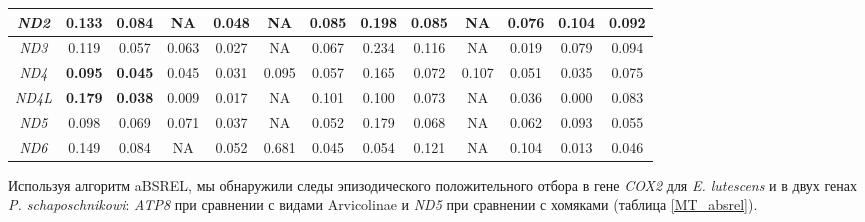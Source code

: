 \begin{landscape}
\begin{table}[]
\begin{tabular}{|c|c|c|c|c|c|c|c|c|c|c|c|c|}
			{\textit{ND2}} & 0.133 & 0.084 & NA & 0.048 & NA & 0.085 & 0.198 & 0.085 & NA & 0.076 & 0.104& 0.092 \\ \hline
			\textit{ND3} & 0.119 & 0.057 & 0.063 & 0.027 & NA & 0.067 & 0.234 & 0.116 & NA & 0.019 & 0.079& 0.094 \\ \hline
			\textit{ND4} & \textbf{0.095} & \textbf{0.045} & 0.045 & 0.031 & 0.095 & 0.057 & 0.165 & 0.072 & 0.107 & 0.051 & 0.035& 0.075 \\ \hline
			\textit{ND4L} & \textbf{0.179} & \textbf{0.038} & 0.009 & 0.017 & NA & 0.101 & 0.100 & 0.073 & NA & 0.036 & 0.000& 0.083 \\ \hline
			{\textit{ND5}} & 0.098 & 0.069 & 0.071 & 0.037 & NA & 0.052 & 0.179 & 0.068 & NA & 0.062 & 0.093& 0.055 \\ \hline
			\textit{ND6} & 0.149 & 0.084 & NA & 0.052 & 0.681 & 0.045 & 0.054 & 0.121 & NA & 0.104 & 0.013& 0.046 \\ \hline
			
		\end{tabular}
	\end{table}

\end{landscape}

Используя алгоритм aBSREL, мы обнаружили следы эпизодического положительного отбора в гене \textit{COX2} для \textit{E. lutescens} и в двух генах \textit{P. schaposchnikowi}: \textit{ATP8} при сравнении с видами Arvicolinae и \textit{ND5} при сравнении с хомяками (таблица \ref{MT_absrel}).

